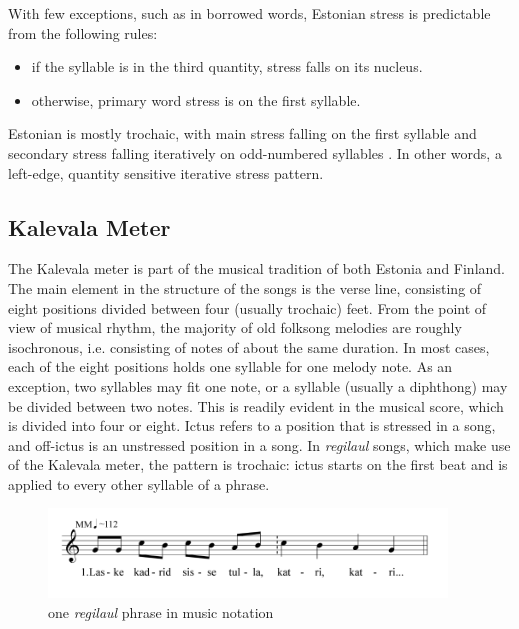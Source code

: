 \documentclass[11pt]{article}
\begin{document}
 With few exceptions, such as in borrowed words, Estonian stress is predictable from the following rules:
 \begin{itemize}
 	\item if the syllable is in the third quantity, stress falls on its nucleus. 
	\item otherwise, primary word stress is on the first syllable. 
\end{itemize}
%

Estonian is mostly trochaic, with main stress falling on the first syllable and secondary stress falling iteratively on odd-numbered syllables \cite{lehisteFunctionQuantityFinnish1965}. 
In other words, a left-edge, quantity sensitive iterative stress pattern.
\subsection*{Kalevala Meter}
  The Kalevala meter is part of the musical tradition of both Estonia and Finland. The main element in the structure of the songs is the verse line, consisting of eight positions divided between four (usually trochaic) feet. From the point of view of musical rhythm, the majority of old folksong melodies are roughly isochronous, i.e. consisting of notes of about the same
 duration. In most cases, each of the eight positions holds one syllable for one melody note. As an exception, two syllables may fit one note, or a syllable (usually a diphthong) may be divided between two notes. This is readily evident in the musical score, which is divided into four or eight. Ictus refers to a position that is stressed in a song, and off-ictus is an unstressed position in a song. In {\it regilaul} songs, which make use of the Kalevala meter, the pattern is trochaic: ictus starts on the first beat and is applied to every other syllable of a phrase. \\
 
 
 \begin{figure}[htbp]
\begin{center}
\includegraphics[width=300pt]{melody.png}
\caption{one {\it regilaul} phrase in music notation}
\label{default}
\end{center}
\end{figure}
\end{document}
